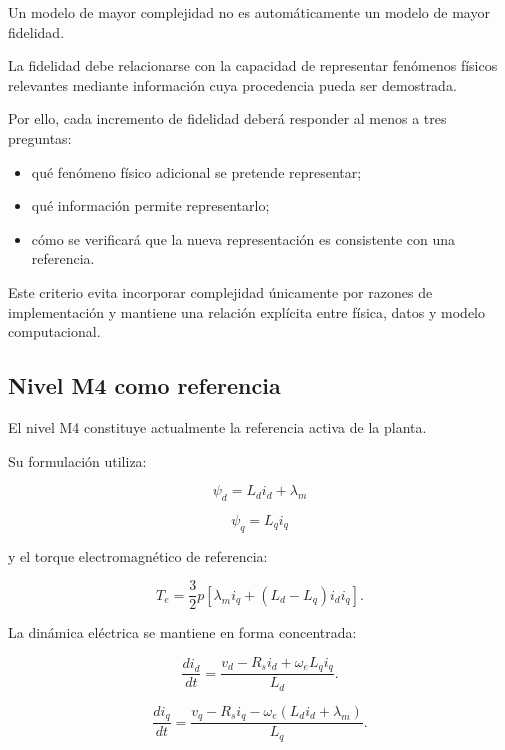 Un modelo de mayor complejidad no es automáticamente un modelo de mayor fidelidad.

La fidelidad debe relacionarse con la capacidad de representar fenómenos físicos relevantes mediante información cuya procedencia pueda ser demostrada.

Por ello, cada incremento de fidelidad deberá responder al menos a tres preguntas:

\begin{itemize}
\item qué fenómeno físico adicional se pretende representar;
\item qué información permite representarlo;
\item cómo se verificará que la nueva representación es consistente con una referencia.
\end{itemize}

Este criterio evita incorporar complejidad únicamente por razones de implementación y mantiene una relación explícita entre física, datos y modelo computacional.

\subsection{Nivel M4 como referencia}

El nivel M4 constituye actualmente la referencia activa de la planta.

Su formulación utiliza:

\begin{equation}
\psi_d=L_di_d+\lambda_m
\end{equation}

\begin{equation}
\psi_q=L_qi_q
\end{equation}

y el torque electromagnético de referencia:

\begin{equation}
T_e=
\frac{3}{2}p
\left[
\lambda_mi_q+
(L_d-L_q)i_di_q
\right].
\end{equation}

La dinámica eléctrica se mantiene en forma concentrada:

\begin{equation}
\frac{di_d}{dt} =
\frac{v_d-R_si_d+\omega_eL_qi_q}{L_d}.
\end{equation}

\begin{equation}
\frac{di_q}{dt} =
\frac{v_q-R_si_q-\omega_e(L_di_d+\lambda_m)}{L_q}.
\end{equation}


